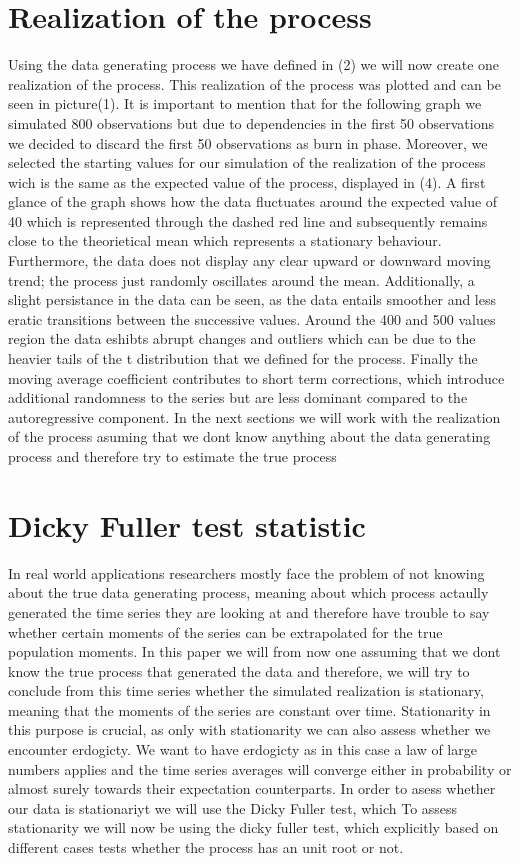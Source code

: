 \documentclass[a4paper,12pt]{article}
\begin{document}
\section{Realization of the process}
Using the data generating process we have defined in (2) we will now create one realization of the process.
This realization of the process was plotted and can be seen in picture(1).
It is important to mention that for the following graph we simulated 800 observations but due to dependencies in the first 50 observations we decided to discard the first 50 observations as burn in phase.
Moreover, we selected the starting values for our simulation of the realization of the process wich is the same as the expected value of the process, displayed in (4).
A first glance of the graph shows how the data fluctuates around the expected value of 40 which is represented through the dashed red line and subsequently remains close to the theorietical mean which represents a stationary behaviour. 
Furthermore, the data does not display any clear upward or downward moving trend; the process just randomly oscillates around the mean. Additionally, a slight persistance in the data can be seen, as the data entails smoother and less eratic transitions between the successive values. Around the 400 and 500 values region the data eshibts abrupt changes and outliers which can be due to the heavier tails of the t distribution that we defined for the process. Finally the moving average coefficient contributes to short term corrections, which introduce additional randomness to the series but are less dominant compared to the autoregressive component.
In the next sections we will work with the realization of the process asuming that we dont know anything about the data generating process and therefore try to estimate the true process

\section{Dicky Fuller test statistic}
In real world applications researchers mostly face the problem of not knowing about the true data generating process, meaning about which process actaully generated the time series they are looking at and therefore have trouble to say whether certain moments of the series can be extrapolated for the true population moments. 
In this paper we will from now one assuming that we dont know the true process that generated the data and therefore, we will try to conclude from this time series whether the simulated realization is stationary, meaning that the moments of the series are constant over time. Stationarity in this purpose is crucial, as only with stationarity we can also assess whether we encounter erdogicty. 
We want to have erdogicty as in this case a law of large numbers applies and the time series averages will converge either in probability or almost surely towards their expectation counterparts. 
In order to asess whether our data is stationariyt we will use the Dicky Fuller test, which 
To assess stationarity we will now be using the dicky fuller test, which explicitly based on different cases tests whether the process has an unit root or not.
\end{document}
